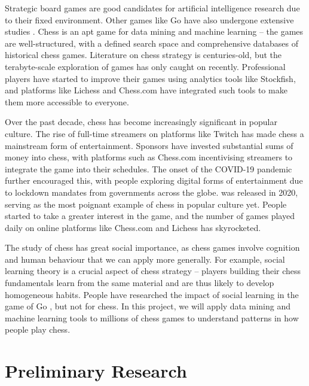 \documentclass[%
 superscriptaddress,
showpacs,preprintnumbers,
 amsmath,
 amssymb,
 aps,
 pra,
showkeys,
onecolumn,
notitlepage,
11pt,
tightenlines      %
]{revtex4-1}
\begin{document}
Strategic board games are good candidates for artificial intelligence research due to their fixed environment. Other games like Go have also undergone extensive studies \cite{muller2002computer}. Chess is an apt game for data mining and machine learning -- the games are well-structured, with a defined search space and comprehensive databases of historical chess games. Literature on chess strategy is centuries-old, but the terabyte-scale exploration of games has only caught on recently. Professional players have started to improve their games using analytics tools like Stockfish, and platforms like Lichess and Chess.com have integrated such tools to make them more accessible to everyone.

Over the past decade, chess has become increasingly significant in popular culture. The rise of full-time streamers on platforms like Twitch has made chess a mainstream form of entertainment. Sponsors have invested substantial sums of money into chess, with platforms such as Chess.com incentivising streamers to integrate the game into their schedules. The onset of the COVID-19 pandemic further encouraged this, with people exploring digital forms of entertainment due to lockdown mandates from governments across the globe.  was released in 2020, serving as the most poignant example of chess in popular culture yet. People started to take a greater interest in the game, and the number of games played daily on online platforms like Chess.com and Lichess has skyrocketed. 

The study of chess has great social importance, as chess games involve cognition and human behaviour that we can apply more generally. For example, social learning theory is a crucial aspect of chess strategy -- players building their chess fundamentals learn from the same material and are thus likely to develop homogeneous habits. People have researched the impact of social learning in the game of Go \cite{beheim2014strategic}, but not for chess. In this project, we will apply data mining and machine learning tools to millions of chess games to understand patterns in how people play chess.

\section{Preliminary Research}
\end{document}

